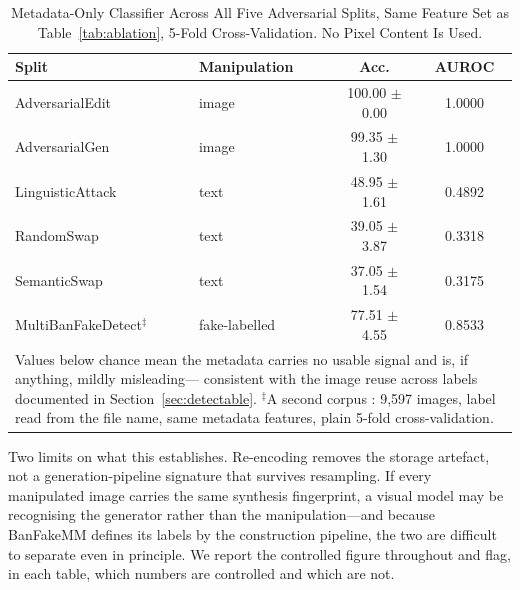 \begin{table}[!tb]
\caption{Metadata-Only Classifier Across All Five Adversarial Splits, Same
Feature Set as Table~\ref{tab:ablation}, 5-Fold Cross-Validation. No Pixel
Content Is Used.}
\label{tab:shortcut}
\centering
\setlength{\tabcolsep}{4pt}
\footnotesize
\begin{tabular}{llcc}
\toprule
\textbf{Split} & \textbf{Manipulation} & \textbf{Acc.} & \textbf{AUROC} \\
\midrule
AdversarialEdit  & image & 100.00 $\pm$ 0.00 & 1.0000 \\
AdversarialGen   & image & 99.35 $\pm$ 1.30 & 1.0000 \\
\midrule
LinguisticAttack & text  & 48.95 $\pm$ 1.61 & 0.4892 \\
RandomSwap       & text  & 39.05 $\pm$ 3.87 & 0.3318 \\
SemanticSwap     & text  & 37.05 $\pm$ 1.54 & 0.3175 \\
\midrule
MultiBanFakeDetect$^{\ddagger}$ & fake-labelled & 77.51 $\pm$ 4.55 & 0.8533 \\
\bottomrule
\multicolumn{4}{p{0.92\columnwidth}}{\footnotesize Values below chance mean the
metadata carries no usable signal and is, if anything, mildly misleading---
consistent with the image reuse across labels documented in
Section~\ref{sec:detectable}. $^{\ddagger}$A second corpus
\cite{multibanfake}: 9{,}597 images, label read from the file name, same
metadata features, plain 5-fold cross-validation.}
\end{tabular}
\end{table}

Two limits on what this establishes. Re-encoding removes the storage artefact,
not a generation-pipeline signature that survives resampling. If every
manipulated image carries the same synthesis fingerprint, a visual model may be
recognising the generator rather than the manipulation---and because BanFakeMM
defines its labels by the construction pipeline, the two are difficult to
separate even in principle. We report the controlled figure throughout and
flag, in each table, which numbers are controlled and which are not.

